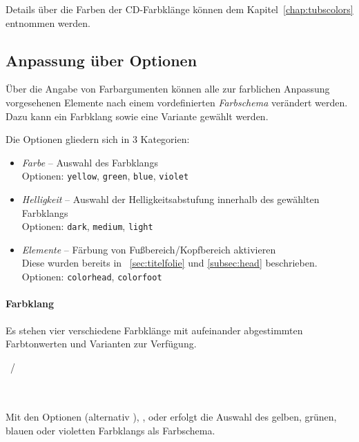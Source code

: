 Details über die Farben der CD-Farbklänge können dem
Kapitel~\ref{chap:tubscolors} entnommen werden.

\subsection{Anpassung über Optionen}

Über die Angabe von Farbargumenten können alle zur farblichen Anpassung
vorgesehenen Elemente nach einem vordefinierten \emph{Farbschema}
verändert werden.
Dazu kann ein Farbklang sowie eine Variante gewählt werden.

Die Optionen gliedern sich in 3 Kategorien:
\begin{itemize}
  \item \emph{Farbe} -- Auswahl des Farbklangs\\
    Optionen: \texttt{yellow}, \texttt{green}, \texttt{blue}, \texttt{violet}
  \item \emph{Helligkeit} -- Auswahl der Helligkeitsabstufung
    innerhalb des gewählten Farbklangs\\
    Optionen: \texttt{dark}, \texttt{medium}, \texttt{light}
  \item \emph{Elemente} -- Färbung von Fußbereich/Kopfbereich aktivieren\\
    Diese wurden bereits in \chaptername~\ref{sec:titelfolie} und \ref{subsec:head} beschrieben.\\
    Optionen: \texttt{colorhead}, \texttt{colorfoot}
\end{itemize}


\paragraph{Farbklang}
Es stehen vier verschiedene Farbklänge mit aufeinander abgestimmten Farbtonwerten
und Varianten zur Verfügung.

\begin{Declaration}
  ~/~\\
  \\
  \\
\end{Declaration}

Mit den Optionen  (alternativ ), , 
oder  erfolgt die Auswahl des
gelben, grünen, blauen oder violetten Farbklangs als Farbschema.

